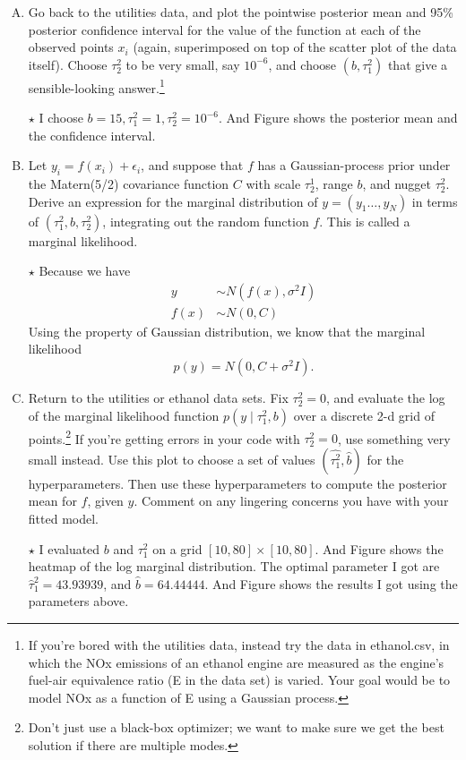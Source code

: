 \documentclass[11pt]{article}
\newcommand{\jie}{$\star$ }
\begin{document}
\begin{enumerate}[(A)]
\item Go back to the utilities data, and plot the pointwise posterior mean and 95\% posterior confidence interval for the value of the function at each of the observed points $x_i$ (again, superimposed on top of the scatter plot of the data itself).  Choose $\tau^2_2$ to be very small, say $10^{-6}$, and choose $(b, \tau^2_1)$ that give a sensible-looking answer.\footnote{If you're bored with the utilities data, instead try the data in ethanol.csv, in which the NOx emissions of an ethanol engine are measured as the engine's fuel-air equivalence ratio (E in the data set) is varied.  Your goal would be to model NOx as a function of E using a Gaussian process. }

\bigskip \jie
I choose $b =15, \tau_1^2 = 1, \tau_2^2 = 10^{-6}$. And Figure shows the posterior mean and the confidence interval.

\item Let $y_i = f(x_i) + \epsilon_i$, and suppose that $f$ has a Gaussian-process prior under the Matern(5/2) covariance function $C$ with scale $\tau^1_2$, range $b$, and nugget $\tau^2_2$.  Derive an expression for the marginal distribution of $y = (y_1 \ldots, y_N)$ in terms of $(\tau^2_1, b, \tau^2_2)$, integrating out the random function $f$.  This is called a marginal likelihood.

\bigskip \jie
Because we have
\begin{align*}
    y &\sim N(f(x), \sigma^2 I) \\
    f(x) &\sim N(0,C)
\end{align*}
Using the property of Gaussian distribution, we know that the marginal likelihood
$$p(y) = N(0, C + \sigma^2 I).$$

\item Return to the utilities or ethanol data sets. Fix $\tau^2_2 = 0$, and evaluate the log of the marginal likelihood function $p(y \mid \tau^2_1, b)$ over a discrete 2-d grid of points.\footnote{Don't just use a black-box optimizer; we want to make sure we get the best solution if there are multiple modes.} If you're getting errors in your code with $\tau^2_2 = 0$, use something very small instead.  Use this plot to choose a set of values $(\hat{\tau^2_1}, \hat{b})$ for the hyperparameters.  Then use these hyperparameters to compute the posterior mean for $f$, given $y$.  Comment on any lingering concerns you have with your fitted model.

\bigskip \jie
I evaluated $b$ and $\tau_1^2$ on a grid $[10,80] \times [10,80]$. And Figure shows the heatmap of the log marginal distribution. The optimal parameter I got are $\hat{\tau}_1^2 = 43.93939$, and $\hat{b} = 64.44444$. And Figure shows the results I got using the parameters above.


\end{enumerate}
\end{document}
